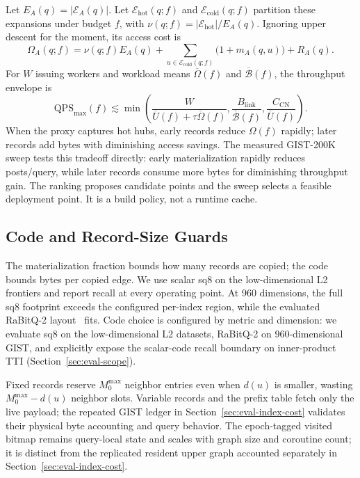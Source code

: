 \documentclass[sigconf,nonacm]{acmart}
\begin{document}
Let $E_A(q)=|\mathcal{E}_A(q)|$.  Let $\mathcal{E}_{\mathrm{hot}}(q;f)$ and
$\mathcal{E}_{\mathrm{cold}}(q;f)$ partition these expansions under budget
$f$, with $\nu(q;f)=|\mathcal{E}_{\mathrm{hot}}|/E_A(q)$.  Ignoring upper
descent for the moment, its access cost is
\begin{equation}
  \Omega_A(q;f)=\nu(q;f)E_A(q)+
  \!\sum_{u\in\mathcal{E}_{\mathrm{cold}}(q;f)}
  \bigl(1+m_A(q,u)\bigr)+R_A(q).
  \label{eq:budget-access}
\end{equation}
For $W$ issuing workers and workload means $\overline{\Omega}(f)$ and
$\overline{\mathcal{B}}(f)$, the throughput envelope is
\begin{equation}
  \mathrm{QPS}_{\max}(f)\lesssim\min\left(
    \frac{W}{\overline{U}(f)+\tau\overline{\Omega}(f)},
    \frac{B_{\mathrm{link}}}{\overline{\mathcal{B}}(f)},
    \frac{C_{\mathrm{CN}}}{\overline{U}(f)}
  \right).
  \label{eq:budget-envelope}
\end{equation}
When the proxy captures hot hubs, early records reduce $\Omega(f)$ rapidly;
later records add bytes with diminishing access savings.  The measured
GIST-200K sweep tests this tradeoff directly: early materialization rapidly
reduces posts/query, while later records consume more bytes for diminishing
throughput gain.  The ranking proposes candidate points and the sweep selects
a feasible deployment point.  It is a build policy, not a runtime cache.

\subsection{Code and Record-Size Guards}

The materialization fraction bounds how many records are copied; the code
bounds bytes per copied edge.  We use scalar sq8 on the low-dimensional L2
frontiers and report recall at every operating point.  At 960 dimensions,
the full sq8 footprint exceeds the configured per-index region, while the
evaluated RaBitQ-2 layout~\cite{rabitq} fits.  Code choice is configured by
metric and dimension: we evaluate sq8 on the low-dimensional L2 datasets,
RaBitQ-2 on 960-dimensional GIST, and explicitly expose the scalar-code recall
boundary on inner-product TTI (Section~\ref{sec:eval-scope}).

Fixed records reserve $M_0^{\max}$ neighbor entries even when $d(u)$ is smaller,
wasting $M_0^{\max}-d(u)$ neighbor slots.  Variable records and the prefix table
fetch only the live payload; the repeated
GIST ledger in Section~\ref{sec:eval-index-cost} validates their physical byte
accounting and query behavior.  The epoch-tagged visited bitmap remains
query-local state and scales with graph size and coroutine count; it is
distinct from the replicated resident upper graph accounted separately in
Section~\ref{sec:eval-index-cost}.
\end{document}
